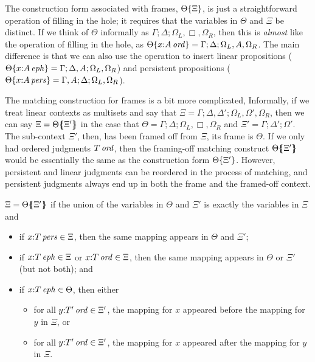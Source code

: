 The construction form associated with frames, ${\Theta}\{{\Xi}\}$,
is just a straightforward operation of filling in the hole; it
requires that the variables in $\Theta$ and $\Xi$ be distinct. If we
think of $\Theta$ informally as $\Gamma; \Delta; \Omega_L, \Box,
\Omega_R$, then this is {\it almost} like the operation of filling in
the hole, as ${\Theta}\{{x{:}{A}\,{{\it ord}}}\} = \Gamma; \Delta;
\Omega_L, A, \Omega_R$. The main difference is that we can also use
the operation to insert linear propositions
(${\Theta}\{{x{:}{A}\,{{\it eph}}}\} = \Gamma; \Delta, A; \Omega_L,
\Omega_R$) and persistent propositions
(${\Theta}\{{x{:}{A}\,{{\it pers}}}\} = \Gamma, A; \Delta; \Omega_L,
\Omega_R$).

The matching construction for frames is a bit more complicated,
Informally, if we treat linear contexts as multisets and say that $\Xi
= \Gamma; \Delta, \Delta'; \Omega_L, \Omega', \Omega_R$, then we can
say $\Xi = {\Theta}\mbox{$\{\hspace{-4pt}\{$}{\Xi'}\mbox{$\}\hspace{-4pt}\}$}$ in the case that $\Theta = \Gamma;
\Delta; \Omega_L, \Box, \Omega_R$ and $\Xi' = \Gamma; \Delta';
\Omega'$. The sub-context $\Xi'$, then, has been framed off from
$\Xi$, its frame is $\Theta$. If we only had ordered judgments
${T}\,{{\it ord}}$, then the framing-off matching construct
${\Theta}\mbox{$\{\hspace{-4pt}\{$}{\Xi'}\mbox{$\}\hspace{-4pt}\}$}$ would be essentially the same as the
construction form ${\Theta}\{{\Xi'}\}$. However, persistent and
linear judgments can be reordered in the process of matching, and
persistent judgments always end up in both the frame and the 
framed-off context. 

\bigskip
\begin{definition}
$\Xi = {\Theta}\mbox{$\{\hspace{-4pt}\{$}{\Xi'}\mbox{$\}\hspace{-4pt}\}$}$ if the union of the variables in 
$\Theta$ and $\Xi'$ is exactly the variables in $\Xi$ and
\begin{itemize}
\item if $x{:}{T}\,{{\it pers}} \in \Xi$, then the same mapping appears in 
  $\Theta$ and $\Xi'$;
\item if $x{:}{T}\,{{\it eph}} \in \Xi$ or $x{:}{T}\,{{\it ord}} \in \Xi$, 
  then the same mapping appears in $\Theta$ or $\Xi'$ (but not both); and
\item if $x{:}{T}\,{{\it eph}} \in \Theta$, then either
  \begin{itemize}
  \item for all $y{:}{T'}\,{{\it ord}} \in \Xi'$, the mapping for $x$ appeared before
    the mapping for $y$ in $\Xi$, or
  \item for all $y{:}{T'}\,{{\it ord}} \in \Xi'$, the mapping for $x$ appeared after
    the mapping for $y$ in $\Xi$. 
  \end{itemize}
\end{itemize}
\end{definition}
\bigskip

